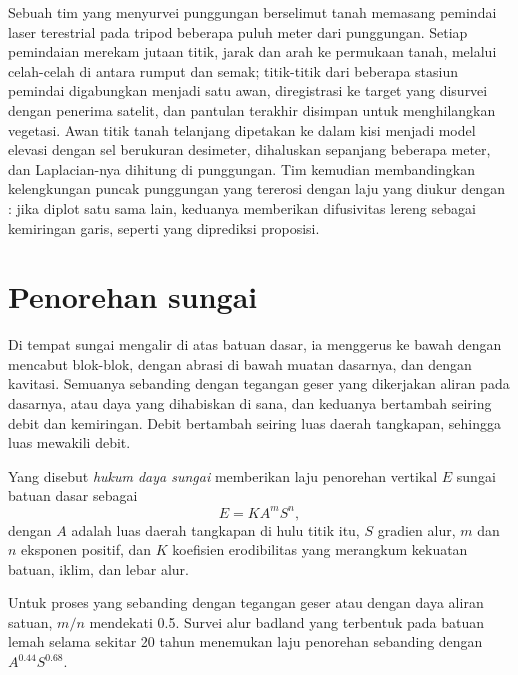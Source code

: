 \begin{inthefield}
Sebuah tim yang menyurvei punggungan berselimut tanah memasang pemindai laser terestrial pada
tripod beberapa puluh meter dari punggungan. Setiap pemindaian merekam jutaan
titik, jarak dan arah ke permukaan tanah, melalui celah-celah di
antara rumput dan semak; titik-titik dari beberapa stasiun pemindai digabungkan
menjadi satu awan, diregistrasi ke target yang disurvei dengan penerima satelit,
dan pantulan terakhir disimpan untuk menghilangkan vegetasi. Awan titik tanah telanjang
dipetakan ke dalam kisi menjadi model elevasi dengan sel berukuran desimeter, dihaluskan sepanjang beberapa
meter, dan Laplacian-nya dihitung di punggungan. Tim kemudian membandingkan
kelengkungan puncak punggungan yang tererosi dengan laju yang diukur dengan
: jika diplot satu sama lain, keduanya memberikan difusivitas
lereng sebagai kemiringan garis, seperti yang diprediksi proposisi.
\end{inthefield}

\section{Penorehan sungai}\label{sec:b3:quantitative-geomorphology:rivers}

Di tempat sungai mengalir di atas batuan dasar, ia menggerus ke bawah dengan mencabut blok-blok,
dengan abrasi di bawah muatan dasarnya, dan dengan kavitasi. Semuanya sebanding dengan tegangan
geser yang dikerjakan aliran pada dasarnya, atau daya yang dihabiskan di sana, dan keduanya
bertambah seiring debit dan kemiringan. Debit bertambah seiring luas daerah tangkapan, sehingga luas
mewakili debit.

\begin{definition}\label{def:b3:quantitative-geomorphology:stream-power}
Yang disebut \emph{hukum daya sungai} memberikan laju
penorehan vertikal $E$ sungai batuan dasar sebagai
\[
E = K A^m S^n ,
\]
dengan $A$ adalah luas daerah tangkapan di hulu titik itu, $S$ gradien alur,
$m$ dan $n$ eksponen positif, dan $K$ koefisien erodibilitas
yang merangkum kekuatan batuan, iklim, dan lebar alur.
\end{definition}

Untuk proses yang sebanding dengan tegangan geser atau dengan daya aliran satuan,
$m/n$ mendekati 0.5. Survei alur badland yang terbentuk pada batuan lemah selama
sekitar 20 tahun menemukan laju penorehan sebanding dengan $A^{0.44}S^{0.68}$.

